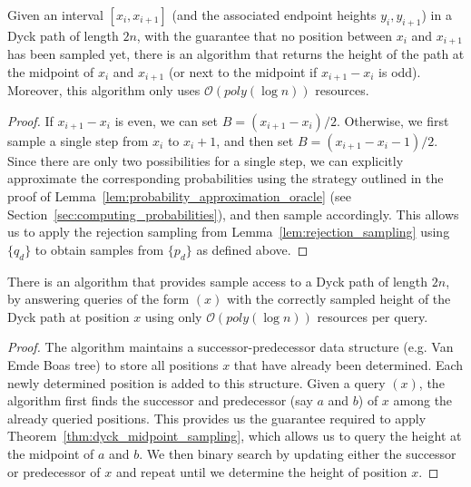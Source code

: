 \begin{theorem}
\label{thm:dyck_midpoint_sampling}
Given an interval $[x_i,x_{i+1}]$ (and the associated endpoint heights $y_i, y_{i+1}$) in a Dyck path of length $2n$,
with the guarantee that no position between $x_i$ and $x_{i+1}$ has been sampled yet,
there is an algorithm that returns the height of the path at the midpoint of $x_i$ and $x_{i+1}$ (or next to the midpoint if $x_{i+1}-x_i$ is odd).
Moreover, this algorithm only uses $\mathcal O(poly(\log n))$ resources.
\end{theorem}
\begin{proof}
If $x_{i+1}-x_i$ is even, we can set $B = (x_{i+1}-x_i)/2$.
Otherwise, we first sample a single step from $x_i$ to $x_i+1$, and then set $B = (x_{i+1}-x_i-1)/2$.
Since there are only two possibilities for a single step, we can explicitly approximate the corresponding probabilities
using the strategy outlined in the proof of Lemma~\ref{lem:probability_approximation_oracle} (see Section~\ref{sec:computing_probabilities}),
and then sample accordingly.
This allows us to apply the rejection sampling from Lemma~\ref{lem:rejection_sampling}
using $\{ q_d\}$ to obtain samples from $\{ p_d\}$ as defined above.
\end{proof}

\begin{theorem}
\label{thm:dyck_height_sampling}
There is an algorithm that provides sample access to a Dyck path of length $2n$,
by answering queries of the form $(x)$ with the correctly sampled height of the Dyck path at position $x$
using only $\mathcal O(poly(\log n))$ resources per query.
\end{theorem}
\begin{proof}
The algorithm maintains a successor-predecessor data structure (e.g. Van Emde Boas tree) to store all positions $x$ that have already been determined.
Each newly determined position is added to this structure.
Given a query $(x)$, the algorithm first finds the successor and predecessor (say $a$ and $b$) of $x$ among the already queried positions.
This provides us the guarantee required to apply Theorem~\ref{thm:dyck_midpoint_sampling},
which allows us to query the height at the midpoint of $a$ and $b$.
We then binary search by updating either the successor or predecessor of $x$ and repeat until we determine the height of position $x$.
\end{proof}




